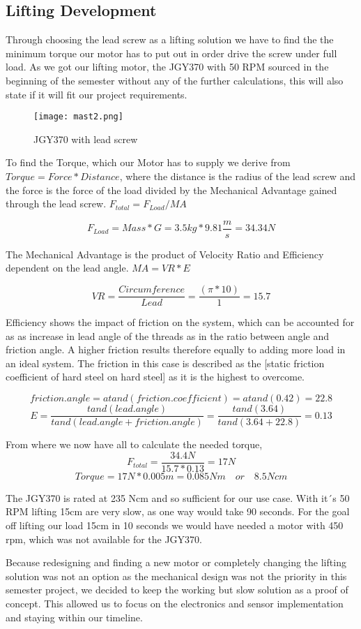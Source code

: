 \documentclass[../report.tex]{subfiles}
\begin{document}
\maketitle

\subsection{Lifting Development}
Through choosing the lead screw as a lifting solution we have to find the
the minimum torque our motor has to put out in order drive the screw under full load.
As we got our lifting motor, the JGY370 with 50 RPM sourced in the beginning of the semester without 
any of the further calculations, this will also state if it will fit our project requirements.

\begin{wrapfigure}{r}{0.5\textwidth}
    \centering
    \texttt{[image: mast2.png]}
    \caption{JGY370 with lead screw}
\end{wrapfigure}
To find the Torque, which our Motor has to supply we derive from $Torque=Force*Distance$, where the 
distance is the radius of the lead screw and the force is the force of the load divided by the Mechanical 
Advantage gained through the lead screw. $F_{total}=F_{Load}/MA$

\[F_{Load}=Mass*G=3.5kg*9.81\frac{m}{s}=34.34N\]

The Mechanical Advantage is the product of Velocity Ratio and Efficiency dependent on the lead 
angle. $MA=VR*E$ 

\[VR=\frac{Circumference}{Lead}=\frac{(\pi*10)}{1}=15.7\]

Efficiency shows the impact of friction on the system, which can be accounted for as as increase in lead angle of the threads 
as in the ratio between angle and friction angle. A higher friction results therefore equally to adding more load in an ideal 
system. The friction in this case is described as the \cite{friction_coefficient}[static 
friction coefficient of hard steel on hard steel] as it is the highest to overcome. 

\[friction.angle=atand(friction.coefficient)= atand(0.42)=22.8\]
\[E=\frac{tand(lead.angle)}{tand(lead.angle+friction.angle)}=\frac{tand(3.64)}{tand(3.64+22.8)}=0.13\]

From where we now have all to calculate the needed torque, 
\[F_{total}=\frac{34.4N}{15.7*0.13}=17N\]
\[Torque=17N*0.005m=0.085Nm\quad or \quad 8.5Ncm\]

The JGY370 is rated at 235 Ncm and so sufficient for our use case. With it´s 50 RPM
lifting 15cm are very slow, as one way would take 90 seconds. For the goal off lifting 
our load 15cm in 10 seconds we would have needed a motor with 450 rpm, which was not 
available for the JGY370.

Because redesigning and finding a new motor 
or completely changing the lifting solution was not an option as the mechanical design 
was not the priority in this semester project, we decided to keep the working but slow 
solution as a proof of concept. This allowed us to focus on the electronics and sensor 
implementation and staying within our timeline.
\end{document}
